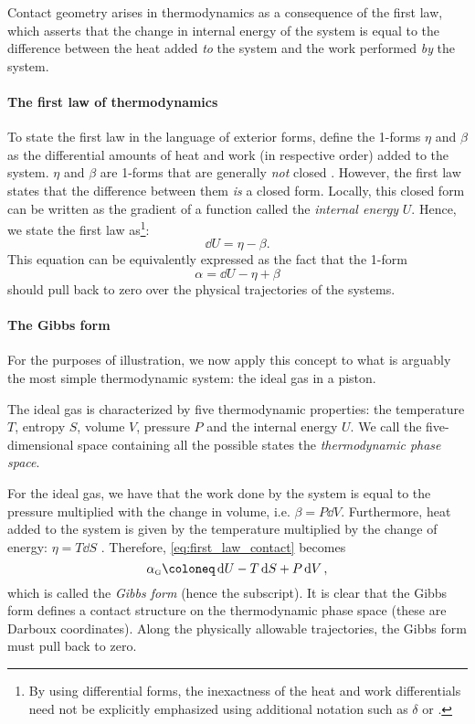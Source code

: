 Contact geometry arises in thermodynamics as a consequence of the first law, which asserts that the change in internal energy of the system is equal to the difference between the heat added \emph{to} the system and the work performed \emph{by} the system. 

\paragraph{The first law of thermodynamics} To state the first law in the language of exterior forms, define the 1-forms $\eta$ and $\beta$ as the differential amounts of heat and work (in respective order) added to the system. $\eta$ and $\beta$ are 1-forms that are generally \emph{not} closed \cite{Bamberg1988,Frankel2012}. However, the first law states that the difference between them \emph{is} a closed form. Locally, this closed form  can be written as the gradient of a function called the \emph{internal energy} $U$. Hence, we state the first law as\footnote{By using differential forms, the inexactness of the heat and work differentials need not be explicitly emphasized using additional notation such as $\delta$ or \dj.}:
\begin{equation}
    \dd{U} = \eta - \beta.
    \label{eq:thermo_first_law}
\end{equation}
This equation can be equivalently expressed as the fact that the 1-form
\begin{equation}
    \alpha = \dd{U} - \eta + \beta
    \label{eq:first_law_contact}
\end{equation}
should pull back to zero over the physical trajectories of the systems.

\paragraph{The Gibbs form} For the purposes of illustration, we now apply this concept to what is arguably the most simple thermodynamic system: the ideal gas in a piston. 

The ideal gas is characterized by five thermodynamic properties: the temperature $T$, entropy $S$, volume $V$, pressure $P$ and the internal energy $U$. We call the five-dimensional space containing all the possible states the \emph{thermodynamic phase space}.

For the ideal gas, we have that the work done by the system is equal to the pressure multiplied with the change in volume, i.e. $\beta = P\dd{V}$. Furthermore, heat added to the system is given by the temperature multiplied by the change of energy: $\eta = T\dd{S}$ \cite{Arnold1989b,Wightman1979,Bamberg1988}. Therefore, \cref{eq:first_law_contact} becomes
\begin{equation}
    \alpha_\text{\tiny G} \coloneq \dd{U} - T\dd{S} + P\dd{V},
    \label{eq:gibbs_form}
\end{equation}
which is called the \emph{Gibbs form} (hence the subscript). It is clear that the Gibbs form defines a contact structure on the thermodynamic phase space (these are Darboux coordinates). Along the physically allowable trajectories, the Gibbs form must pull back to zero.

